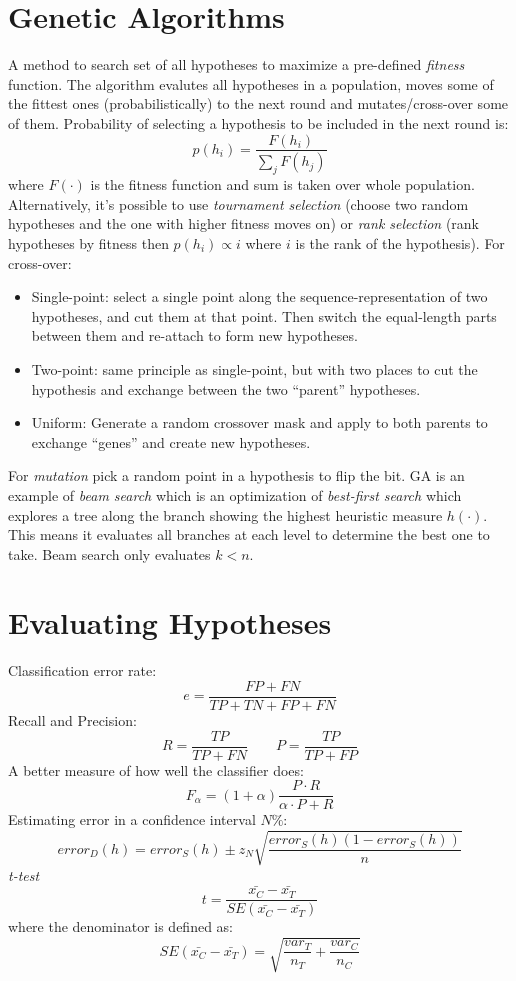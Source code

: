 \documentclass[a4paper,10pt]{article}
\begin{document}
\section{Genetic Algorithms}
A method to search set of all hypotheses to maximize a pre-defined \emph{fitness} function.  The algorithm evalutes all hypotheses in a population, moves some of the fittest ones (probabilistically) to the next round and mutates/cross-over some of them.  Probability of selecting a hypothesis to be included in the next round is:
$$
p(h_i) = \frac{F(h_i)}{\sum_j F(h_j)}
$$
where $F(\cdot)$ is the fitness function and sum is taken over whole population.  Alternatively, it's possible to use \emph{tournament selection} (choose two random hypotheses and the one with higher fitness moves on) or \emph{rank selection} (rank hypotheses by fitness then $p(h_i)\propto i$ where $i$ is the rank of the hypothesis).  For cross-over:
\begin{itemize}
\item Single-point: select a single point along the sequence-representation of two hypotheses, and cut them at that point.  Then switch the equal-length parts between them and re-attach to form new hypotheses.
\item Two-point: same principle as single-point, but with two places to cut the hypothesis and exchange between the two ``parent'' hypotheses.
\item Uniform: Generate a random crossover mask and apply to both parents to exchange ``genes'' and create new hypotheses.
\end{itemize}
For \emph{mutation} pick a random point in a hypothesis to flip the bit.  GA is an example of \emph{beam search} which is an optimization of \emph{best-first search} which explores a tree along the branch showing the highest heuristic measure $h(\cdot)$.  This means it evaluates all branches at each level to determine the best one to take.  Beam search only evaluates $k<n$.

\section{Evaluating Hypotheses}
Classification error rate:
$$
e = \frac{FP + FN}{TP + TN + FP + FN}
$$
Recall and Precision:
$$
R = \frac{TP}{TP + FN} \qquad P = \frac{TP}{TP + FP}
$$
A better measure of how well the classifier does:
$$
F_{\alpha} = (1 + \alpha)\frac{P\cdot R}{\alpha \cdot P + R}
$$
Estimating error in a confidence interval $N\%$:
$$
error_D(h) = error_S(h) \pm z_N\sqrt{\frac{error_S(h)(1-error_S(h))}{n}}
$$
\emph{t-test}
$$
t = \frac{\bar{x_C} - \bar{x_T}}{SE(\bar{x_C} - \bar{x_T})}
$$
where the denominator is defined as:
$$
SE(\bar{x_C} - \bar{x_T}) = \sqrt{\frac{var_T}{n_T} + \frac{var_C}{n_C}}
$$
\end{document}
